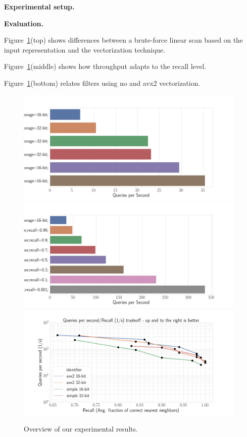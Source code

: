 \documentclass{llncs}
\newcommand{\myparagraph}[1]{\noindent \textbf{#1}}
\begin{document}
\myparagraph{Experimental setup.}

\myparagraph{Evaluation.}

Figure~\ref{plot:eval}(top) shows differences between a brute-force linear scan based on the input representation and the vectorization technique. 

Figure~\ref{plot:eval}(middle) shows how throughput adapts to the recall level. 

Figure~\ref{plot:eval}(bottom) relates filters using no and avx2 vectorization.

\begin{figure}
  \includegraphics[width=\textwidth]{figs/linearscan_no_filter.png}
  \includegraphics[width=\textwidth]{figs/16bit_filter.png}
  \includegraphics[width=\textwidth]{figs/avx2_16vs32bit.png}
  \caption{Overview of our experimental results.}
  \label{plot:eval}
\end{figure}
\end{document}
